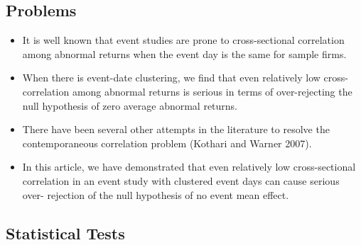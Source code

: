 \documentclass[12pt]{article}
\begin{document}
\subsection{Problems}

    \begin{itemize}

        \item It is well known that event studies are prone to cross-sectional correlation among abnormal returns when the event day is the same for sample firms. \citep{Kolari2010}

        \item When there is event-date clustering, we find that even relatively low cross-correlation among abnormal returns is serious in terms of over-rejecting the null hypothesis of zero average abnormal returns. \citep{Kolari2010}

        \item There have been several other attempts in the literature to resolve the contemporaneous correlation problem (Kothari and Warner 2007).\citep{Kolari2010}

        \item In this article, we have demonstrated that even relatively low cross-sectional correlation in an event study with clustered event days can cause serious over- rejection of the null hypothesis of no event mean effect. \citep{Kolari2010}

    \end{itemize}
    
\subsection{Statistical Tests}
\end{document}
